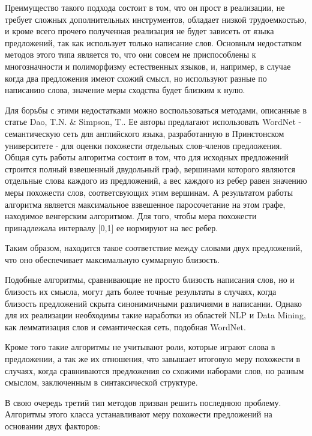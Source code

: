 Преимущество такого подхода состоит в том, что он прост в реализации, не требует
сложных дополнительных инструментов, обладает низкой трудоемкостью, и кроме всего
прочего полученная реализация не будет зависеть от языка предложений, 
так как использует только написание слов.
Основным недостатком методов этого типа является то, что они совсем
не приспособлены к многозначности и полиморфизму естественных языков, и,
например, в случае когда два предложения имеют схожий смысл, но используют разные по написанию слова,
значение меры сходства будет близким к нулю.

Для борьбы с этими недостатками можно воспользоваться методами, описанные в статье Dao, T.N. & Simpson, T.\cite{wordnetSim}.
Ее авторы предлагают использовать WordNet\cite{wordnet} - семантическую сеть для английского языка, 
разработанную в Принстонском университете - для оценки похожести отдельных слов-членов предложения.
Общая суть работы алгоритма состоит в том, что для исходных предложений
строится полный взвешенный двудольный граф, вершинами которого являются отдельные
слова каждого из предложений, а вес каждого из ребер равен значению меры похожести слов,
соответсвующих этим вершинам. А результатом работы алгоритма является максимальное
взвешенное паросочетание на этом графе, находимое венгерским алгоритмом.
Для того, чтобы мера похожести принадлежала интервалу [0,1] ее нормируют на вес ребер.

Таким образом, находится такое соответствие между словами двух предложений,
что оно обеспечивает максимальную суммарную близость.

Подобные алгоритмы, сравнивающие не просто близость написания слов, 
но и близость их смысла, могут дать более точные результаты в случаях, 
когда близость предложений скрыта синонимичными различиями в написании.
Однако для их реализации необходимы такие наработки из областей NLP и Data Mining, 
как лемматизация слов и семантическая сеть, подобная WordNet\cite{wordnet}.


Кроме того такие алгоритмы не учитывают роли, которые играют слова в предложении,
а так же их отношения, что завышает итоговую меру похожести в случаях,
когда сравниваются предложения со схожими наборами слов, но разным смыслом,
заключенным в синтаксической структуре.

В свою очередь третий тип методов призван решить последнюю проблему. 
Алгоритмы этого класса устанавливают меру похожести предложений на основании двух факторов:

